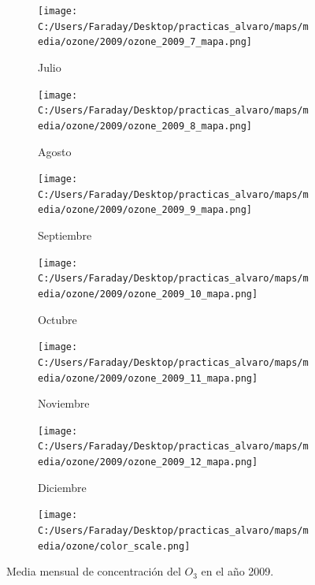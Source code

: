 \documentclass[12pt]{article}
\begin{document}
\begin{figure}[H]
\begin{subfigure}[H]{0.15\textwidth}
\texttt{[image: C:/Users/Faraday/Desktop/practicas\_alvaro/maps/media/ozone/2009/ozone\_2009\_7\_mapa.png]}
\captionsetup{labelformat=empty}
\caption{Julio}
\label{fig:map-ozone-2009-7}
\end{subfigure}
%
\begin{subfigure}[H]{0.15\textwidth}
\texttt{[image: C:/Users/Faraday/Desktop/practicas\_alvaro/maps/media/ozone/2009/ozone\_2009\_8\_mapa.png]}
\captionsetup{labelformat=empty}
\caption{Agosto}
\label{fig:map-ozone-2009-8}
\end{subfigure}
%
\begin{subfigure}[H]{0.15\textwidth}
\texttt{[image: C:/Users/Faraday/Desktop/practicas\_alvaro/maps/media/ozone/2009/ozone\_2009\_9\_mapa.png]}
\captionsetup{labelformat=empty}
\caption{Septiembre}
\label{fig:map-ozone-2009-9}
\end{subfigure}
%
\begin{subfigure}[H]{0.15\textwidth}
\texttt{[image: C:/Users/Faraday/Desktop/practicas\_alvaro/maps/media/ozone/2009/ozone\_2009\_10\_mapa.png]}
\captionsetup{labelformat=empty}
\caption{Octubre}
\label{fig:map-ozone-2009-10}
\end{subfigure}
%
\begin{subfigure}[H]{0.15\textwidth}
\texttt{[image: C:/Users/Faraday/Desktop/practicas\_alvaro/maps/media/ozone/2009/ozone\_2009\_11\_mapa.png]}
\captionsetup{labelformat=empty}
\caption{Noviembre}
\label{fig:map-ozone-2009-11}
\end{subfigure}
%
\begin{subfigure}[H]{0.15\textwidth}
\texttt{[image: C:/Users/Faraday/Desktop/practicas\_alvaro/maps/media/ozone/2009/ozone\_2009\_12\_mapa.png]}
\captionsetup{labelformat=empty}
\caption{Diciembre}
\label{fig:map-ozone-2009-12}
\end{subfigure}

\begin{subfigure}[H]{0.45\textwidth}
\texttt{[image: C:/Users/Faraday/Desktop/practicas\_alvaro/maps/media/ozone/color\_scale.png]}
\captionsetup{labelformat=empty}
\caption{}
\end{subfigure}

\vspace*{-7mm}
\caption{Media mensual de concentración del $O_{3}$ en el año 2009.}
\label{fig:map-ozone-2009}
\end{figure}
\end{document}
